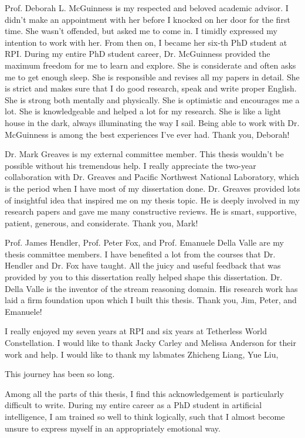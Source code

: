 Prof. Deborah L. McGuinness is my respected and beloved academic advisor. 
I didn't make an appointment with her before I knocked on her door for the first time. 
She wasn't offended, but asked me to come in. 
I timidly expressed my intention to work with her. 
From then on, I became her six-th PhD student at RPI.
During my entire PhD student career, Dr. McGuinness provided the maximum freedom for me to learn and explore.
She is considerate and often asks me to get enough sleep.
She is responsible and revises all my papers in detail.
She is strict and makes sure that I do good research, speak and write proper English.
She is strong both mentally and physically. 
She is optimistic and encourages me a lot. 
She is knowledgeable and helped a lot for my research. 
She is like a light house in the dark, always illuminating the way I sail.
Being able to work with Dr. McGuinness is among the best experiences I've ever had.
Thank you, Deborah!

Dr. Mark Greaves is my external committee member. 
This thesis wouldn't be possible without his tremendous help. 
I really appreciate the two-year collaboration with Dr. Greaves and Pacific Northwest National Laboratory, which is the period when I have most of my dissertation done.
Dr. Greaves provided lots of insightful idea that inspired me on my thesis topic. 
He is deeply involved in my research papers and gave me many constructive reviews.
He is smart, supportive, patient, generous, and considerate.
Thank you, Mark!

Prof. James Hendler, Prof. Peter Fox, and Prof. Emanuele Della Valle are my thesis committee members. 
I have benefited a lot from the courses that Dr. Hendler and Dr. Fox have taught.
All the juicy and useful feedback that was provided by you to this dissertation really helped shape this dissertation.
Dr. Della Valle is the inventor of the stream reasoning domain.
His research work has laid a firm foundation upon which I built this thesis.
Thank you, Jim, Peter, and Emanuele!

I really enjoyed my seven years at RPI and six years at Tetherless World Constellation. 
I would like to thank Jacky Carley and Melissa Anderson for their work and help. 
I would like to thank my labmates Zhicheng Liang, Yue Liu, 

  
This journey has been so long.

Among all the parts of this thesis, I find this acknowledgement is particularly difficult to write. During my entire career as a PhD student in artificial intelligence, I am trained so well to think logically, such that I almost become unsure to express myself in an appropriately emotional way. 

